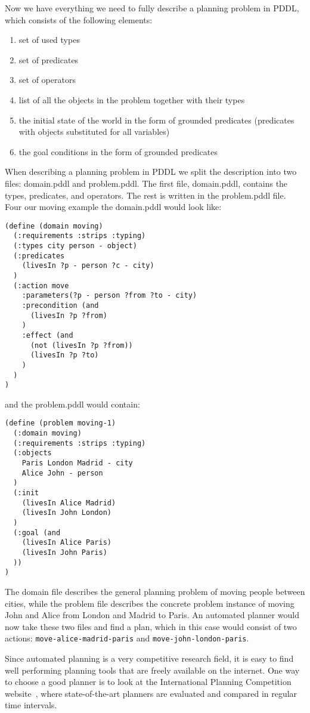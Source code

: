 \documentclass[runningheads]{llncs}
\begin{document}
Now we have everything we need to fully describe a planning problem in PDDL, which consists of the following
elements:
\begin{enumerate}
\item set of used types
\item set of predicates
\item set of operators
\item list of all the objects in the problem together with their types
\item the initial state of the world in the form of grounded predicates (predicates with objects substituted for
all variables)
\item the goal conditions in the form of grounded predicates
\end{enumerate}

When describing a planning problem in PDDL we split the description into two files: domain.pddl and problem.pddl.
The first file, domain.pddl, contains the types, predicates, and operators. The rest is written in the problem.pddl
file. Four our moving example the domain.pddl would look like:

\begin{verbatim}
(define (domain moving)
  (:requirements :strips :typing)
  (:types city person - object)
  (:predicates
    (livesIn ?p - person ?c - city)
  )
  (:action move
    :parameters(?p - person ?from ?to - city)
    :precondition (and
      (livesIn ?p ?from)
    )
    :effect (and
      (not (livesIn ?p ?from))
      (livesIn ?p ?to)
    )
  )
)
\end{verbatim}
and the problem.pddl would contain:
\begin{verbatim}
(define (problem moving-1)
  (:domain moving)
  (:requirements :strips :typing)
  (:objects
    Paris London Madrid - city
    Alice John - person
  )
  (:init
    (livesIn Alice Madrid)
    (livesIn John London)
  )
  (:goal (and
    (livesIn Alice Paris)
    (livesIn John Paris)
  ))
)
\end{verbatim}
The domain file describes the general planning problem of moving people between cities, while the problem
file describes the concrete problem instance of moving John and Alice from London and Madrid to Paris.
An automated planner would now take these two files and find a plan, which in this case would consist of two
actions: \verb _move-alice-madrid-paris_ and \verb _move-john-london-paris_.

Since automated planning is a very competitive research field, it is easy to find well performing
planning tools that are freely available on the internet. One way to choose a good planner is to look
at the International Planning Competition website~\cite{ipc}, where state-of-the-art planners are evaluated
and compared in regular time intervals.
\end{document}
